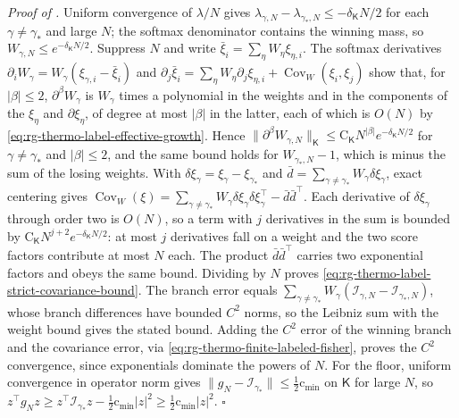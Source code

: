 \noindent\emph{Proof of .}
Uniform convergence of $\lambda/N$ gives
$\lambda_{\gamma,N}-\lambda_{\gamma_*,N}\leq-\delta_{\mathsf K}N/2$ for each $\gamma\neq\gamma_*$ and
large $N$; the softmax denominator contains the winning mass, so
$W_{\gamma,N}\leq e^{-\delta_{\mathsf K}N/2}$. Suppress $N$ and write
$\bar\xi_i=\sum_\eta W_\eta\xi_{\eta,i}$. The softmax derivatives
$\partial_iW_\gamma=W_\gamma(\xi_{\gamma,i}-\bar\xi_i)$ and
$\partial_j\bar\xi_i=\sum_\eta W_\eta\partial_j\xi_{\eta,i}+\operatorname{Cov}_W(\xi_i,\xi_j)$ show
that, for $\lvert\beta\rvert\leq2$, $\partial^\beta W_\gamma$ is $W_\gamma$ times a polynomial in
the weights and in the components of the $\xi_\eta$ and $\partial\xi_\eta$, of degree at most
$\lvert\beta\rvert$ in the latter, each of which is $O(N)$ by
\eqref{eq:rg-thermo-label-effective-growth}. Hence
$\|\partial^\beta W_{\gamma,N}\|_{\mathsf K}\leq\mathrm C_{\mathsf K}N^{\lvert\beta\rvert}
e^{-\delta_{\mathsf K}N/2}$ for $\gamma\neq\gamma_*$ and $\lvert\beta\rvert\leq2$, and the same
bound holds for $W_{\gamma_*,N}-1$, which is minus the sum of the losing weights. With
$\delta\xi_\gamma=\xi_\gamma-\xi_{\gamma_*}$ and
$\bar d=\sum_{\gamma\neq\gamma_*}W_\gamma\delta\xi_\gamma$, exact centering gives
$\operatorname{Cov}_W(\xi)=\sum_{\gamma\neq\gamma_*}W_\gamma\delta\xi_\gamma\delta\xi_\gamma^\top-\bar d\bar d^\top$.
Each derivative of $\delta\xi_\gamma$ through order two is $O(N)$, so a term with $j$ derivatives in
the sum is bounded by $\mathrm C_{\mathsf K}N^{j+2}e^{-\delta_{\mathsf K}N/2}$: at most $j$
derivatives fall on a weight and the two score factors contribute at most $N$ each. The product
$\bar d\bar d^\top$ carries two exponential factors and obeys the same bound. Dividing by $N$ proves
\eqref{eq:rg-thermo-label-strict-covariance-bound}. The branch error equals
$\sum_{\gamma\neq\gamma_*}W_\gamma(\mathcal I_{\gamma,N}-\mathcal I_{\gamma_*,N})$, whose branch
differences have bounded $C^2$ norms, so the Leibniz sum with the weight bound gives the stated
bound. Adding the $C^2$ error of the
winning branch and the covariance error, via \eqref{eq:rg-thermo-finite-labeled-fisher}, proves the
$C^2$ convergence, since exponentials dominate the powers of $N$. For the floor, uniform convergence
in operator norm gives $\|g_N-\mathcal I_{\gamma_*}\|\leq\tfrac12\mathrm c_{\min}$ on $\mathsf K$ for
large $N$, so $z^\top g_Nz\geq z^\top\mathcal I_{\gamma_*}z-\tfrac12\mathrm c_{\min}\lvert z\rvert^2
\geq\tfrac12\mathrm c_{\min}\lvert z\rvert^2$. $\square$

